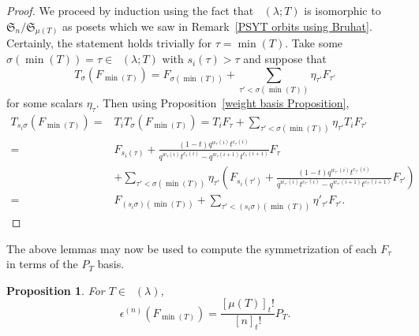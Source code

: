 \documentclass[pdftex]{sigma}
\numberwithin{equation}{section}
\newtheorem{Proposition}[Theorem]{Proposition}
\theoremstyle{definition}
\DeclareMathOperator{\PSYT}{\mathrm{PSYT}_{\geq 0}}
\DeclareMathOperator{\RSSYT}{\mathrm{RSSYT}_{\geq 0}}
\DeclareMathOperator{\Min}{\mathrm{min}}
\begin{document}
\begin{proof}
 We proceed by induction using the fact that $\PSYT(\lambda;T)$ is isomorphic to $\mathfrak{S}_n/\mathfrak{S}_{\mu(T)}$ as posets which we saw in Remark~\ref{PSYT orbits using Bruhat}. Certainly, the statement holds trivially for $\tau = \Min(T)$. Take some $\sigma(\Min(T)) = \tau \in \PSYT(\lambda;T)$ with $s_i(\tau) > \tau$ and suppose that
 \[
 T_{\sigma}(F_{\Min(T)}) = F_{\sigma(\Min(T))} + \sum_{\tau' < \sigma(\Min(T))} \eta_{\tau'} F_{\tau'}
 \]
 for some scalars $\eta_{\tau}$.
 Then using Proposition~\ref{weight basis Proposition},
 \begin{align*}
 T_{s_i\sigma}(F_{\Min(T)})
 ={}& T_iT_{\sigma}(F_{\Min(T)})
 = T_iF_{\tau} + \sum_{\tau' < \sigma(\Min(T))} \eta_{\tau'} T_iF_{\tau'} \\
 ={}& F_{s_i(\tau)} + \frac{(1-t)q^{w_{\tau}(i)}t^{c_{\tau}(i)}}{q^{w_{\tau}(i)}t^{c_{\tau}(i)} - q^{w_{\tau}(i+1)}t^{c_{\tau}(i+1)}} F_{\tau} \\
 & + \sum_{\tau' < \sigma(\Min(T))} \eta_{\tau'} \left(F_{s_i(\tau')} + \frac{(1-t)q^{w_{\tau'}(i)}t^{c_{\tau'}(i)}}{q^{w_{\tau'}(i)}t^{c_{\tau'}(i)} - q^{w_{\tau'}(i+1)}t^{c_{\tau'}(i+1)}} F_{\tau'} \right) \\
 ={}& F_{(s_i\sigma)(\Min(T))} + \sum_{\tau' < (s_i\sigma)(\Min(T))}\eta'_{\tau'} F_{\tau'}. \tag*{\qed}
 \end{align*} \renewcommand{\qed}{}
\end{proof}

The above lemmas may now be used to compute the symmetrization of each $F_{\tau}$ in terms of the $P_{T}$ basis.

\begin{Proposition}\label{sym Macd coeff for symmetrization of lowest term}
 For $T \in \RSSYT(\lambda)$,
 \[
 \epsilon^{(n)}(F_{\Min(T)}) = \frac{[\mu(T)]_{t}!}{[n]_{t}!}P_T.
 \]

\end{Proposition}
\end{document}
